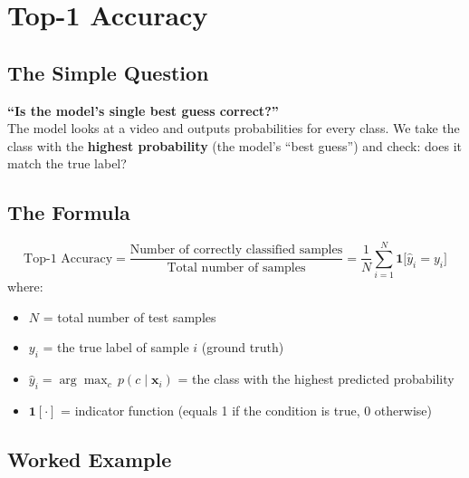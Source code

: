 \documentclass[12pt, a4paper]{article}
\begin{document}
\newpage
\section{Top-1 Accuracy}

\subsection{The Simple Question}

\begin{keyidea}
\textbf{``Is the model's single best guess correct?''}\\[0.3cm]
The model looks at a video and outputs probabilities for every class. We take the class with the \textbf{highest probability} (the model's ``best guess'') and check: does it match the true label?
\end{keyidea}

\subsection{The Formula}

\begin{formulabox}
\[
\boxed{\text{Top-1 Accuracy} = \frac{\text{Number of correctly classified samples}}{\text{Total number of samples}} = \frac{1}{N}\sum_{i=1}^{N} \mathbf{1}\big[\hat{y}_i = y_i\big]}
\]
where:
\begin{itemize}
    \item $N$ = total number of test samples
    \item $y_i$ = the true label of sample $i$ (ground truth)
    \item $\hat{y}_i = \arg\max_c \, p(c \mid \mathbf{x}_i)$ = the class with the highest predicted probability
    \item $\mathbf{1}[\cdot]$ = indicator function (equals 1 if the condition is true, 0 otherwise)
\end{itemize}
\end{formulabox}

\subsection{Worked Example}
\end{document}

